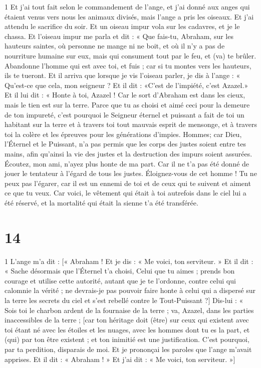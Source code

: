 \par 1 Et j'ai tout fait selon le commandement de l'ange, et j'ai donné aux anges qui étaient venus vers nous les animaux divisés, mais l'ange a pris les oiseaux. Et j'ai attendu le sacrifice du soir. Et un oiseau impur vola sur les cadavres, et je le chassa. Et l'oiseau impur me parla et dit : « Que fais-tu, Abraham, sur les hauteurs saintes, où personne ne mange ni ne boit, et où il n'y a pas de nourriture humaine sur eux, mais qui consument tout par le feu, et (va) te brûler. Abandonne l'homme qui est avec toi, et fuis ; car si tu montes vers les hauteurs, ils te tueront. Et il arriva que lorsque je vis l'oiseau parler, je dis à l'ange : « Qu'est-ce que cela, mon seigneur ? Et il dit : «C'est de l'impiété, c'est Azazel.» Et il lui dit : « Honte à toi, Azazel ! Car le sort d'Abraham est dans les cieux, mais le tien est sur la terre. Parce que tu as choisi et aimé ceci pour la demeure de ton impureté, c'est pourquoi le Seigneur éternel et puissant a fait de toi un habitant sur la terre et à travers toi tout mauvais esprit de mensonge, et à travers toi la colère et les épreuves pour les générations d'impies. Hommes; car Dieu, l'Éternel et le Puissant, n'a pas permis que les corps des justes soient entre tes mains, afin qu'ainsi la vie des justes et la destruction des impurs soient assurées. Écoutez, mon ami, n'ayez plus honte de ma part. Car il ne t'a pas été donné de jouer le tentateur à l'égard de tous les justes. Éloignez-vous de cet homme ! Tu ne peux pas l'égarer, car il est un ennemi de toi et de ceux qui te suivent et aiment ce que tu veux. Car voici, le vêtement qui était à toi autrefois dans le ciel lui a été réservé, et la mortalité qui était la sienne t'a été transférée.

\chapter{14}

\par 1 L'ange m'a dit : [« Abraham ! Et je dis : « Me voici, ton serviteur. » Et il dit : « Sache désormais que l'Éternel t'a choisi, Celui que tu aimes ; prends bon courage et utilise cette autorité, autant que je te l'ordonne, contre celui qui calomnie la vérité ; ne devrais-je pas pouvoir faire honte à celui qui a dispersé sur la terre les secrets du ciel et s'est rebellé contre le Tout-Puissant ?] Dis-lui : « Sois toi le charbon ardent de la fournaise de la terre ; va, Azazel, dans les parties inaccessibles de la terre ; [car ton héritage doit (être) sur ceux qui existent avec toi étant né avec les étoiles et les nuages, avec les hommes dont tu es la part, et (qui) par ton être existent ; et ton inimitié est une justification. C'est pourquoi, par ta perdition, disparais de moi. Et je prononçai les paroles que l'ange m'avait apprises. Et il dit : « Abraham ! » Et j’ai dit : « Me voici, ton serviteur. »]

